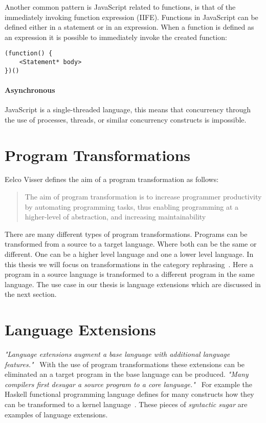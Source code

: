 Another common pattern is JavaScript related to functions, is that of the immediately invoking function expression (IIFE). Functions in JavaScript can be defined either in a statement or in an expression. When a function is defined as an expression it is possible to immediately invoke the created function:

\begin{lstlisting}[title=IIFE,caption={Immediately invoking function expression}]
(function() {
	<Statement* body>
})()
\end{lstlisting}

\paragraph{Asynchronous}
JavaScript is a single-threaded language, this means that concurrency through the use of processes, threads, or similar concurrency constructs is impossible.

\section{Program Transformations}
Eelco Visser defines the aim of a program transformation as follows:

\blockquote[\cite{Visser2001}]{The aim of program transformation is to increase programmer productivity by automating programming tasks, thus enabling programming at a higher-level of abstraction, and increasing maintainability}

There are many different types of program transformations. Programs can be transformed from a source to a target language. Where both can be the same or different. One can be a higher level language and one a lower level language. In this thesis we will focus on transformations in the category rephrasing~\cite{Visser2001}. Here a program in a source language is transformed to a different program in the same language. The use case in our thesis is language extensions which are discussed in the next section.

\section{Language Extensions} \label{lang-ext}
\textit{"Language extensions augment a base language with additional language features."}~\cite{Erdweg2014} 
With the use of program transformations these extensions can be eliminated an a target program in the base language can be produced. \textit{"Many compilers first desugar a source program to a core language."}~\cite{Erdweg2014} For example the Haskell functional programming language defines for many constructs how they can be transformed to a kernel language~\cite{PeytonJones}. These pieces of \textit{syntactic sugar} are examples of language extensions.

